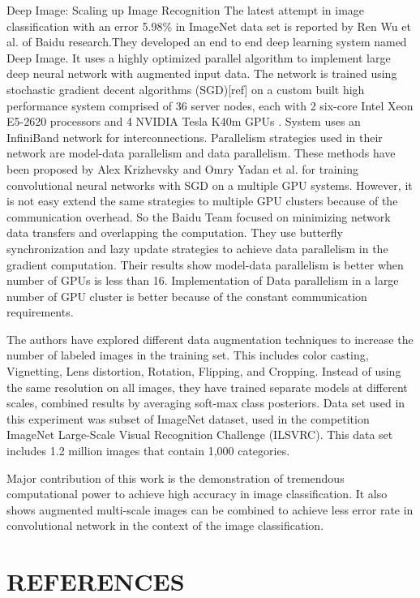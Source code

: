 \documentclass{article}
\begin{document}
\begin{section}{Deep Image: Scaling up Image Recognition}
The latest attempt in image classification with an error 5.98\% in ImageNet data set is reported by  Ren Wu et al. \cite{Wu2015} of Baidu research.They developed an end to end deep learning  system named Deep Image. It uses a highly optimized parallel algorithm  to implement large deep neural network with augmented input data. The network is trained using stochastic gradient decent algorithms (SGD)[ref] on a custom built high performance system comprised of 36 server nodes, each with 2 six-core Intel Xeon E5-2620 processors and 4 NVIDIA Tesla K40m GPUs . System  uses an InfiniBand  network for interconnections. Parallelism strategies used in their network are model-data parallelism and data parallelism.  These methods have been proposed by Alex Krizhevsky \cite{Krizhevsky2014} and Omry Yadan et al. \cite{Yadan2013} for training convolutional neural networks with SGD on a  multiple GPU systems. However, it is not easy extend the same strategies to multiple GPU clusters because of the communication overhead. So the  Baidu Team focused on minimizing network data transfers and overlapping the computation. They use butterfly synchronization and lazy update strategies to achieve data parallelism in the gradient computation. Their results show model-data parallelism is better when number of GPUs is less than 16. Implementation of Data parallelism in a large number  of GPU  cluster is better because of the constant communication requirements.
\par
The authors have explored different data augmentation techniques to increase the number of labeled images in the training set. This includes color casting, Vignetting, Lens distortion, Rotation, Flipping, and  Cropping. Instead of using the same resolution on all images, they have trained separate models at different scales, combined results by averaging soft-max class posteriors.
Data set used in this experiment was subset of ImageNet dataset, used in the competition ImageNet Large-Scale Visual Recognition Challenge (ILSVRC)\cite{Berg2010}. This data set includes 1.2 million images that contain 1,000 categories.
\par
 Major contribution of this work is the demonstration of tremendous computational power to achieve high accuracy in image classification.
It also shows augmented multi-scale images can be combined to achieve less error rate in convolutional network in the context of the image classification. 
 \end{section}




\section{REFERENCES}
\label{sec:survey}


\end{document}
